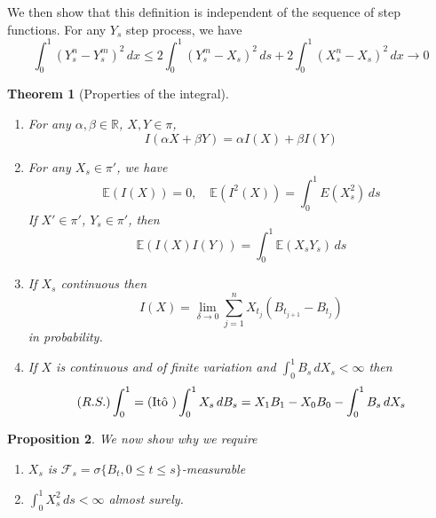 \documentclass[10pt, oneside, reqno]{amsart}
\theoremstyle{plain}%
\newtheorem{thm}{Theorem}[section]
\newtheorem{prop}[thm]{Proposition}
\theoremstyle{definition}
\theoremstyle{remark}
\newcommand{\R}{\mathbb{R}}
\newcommand{\E}{\mathbb{E}}
\newcommand{\sigf}{\mathcal{F}}
\begin{document}
We then show that this definition is independent of the sequence of step functions.  For any $Y_s$ step process, we have \[
	\int_0^1 (Y_s^n - Y_s^m)^2 \, dx \leq 2\int_0^1 (Y_s^m - X_s)^2 \, ds + 2 \int_0^1 (X_s^n - X_s)^2 \, dx \rightarrow 0
\] 

\begin{thm}[Properties of the \ito integral]{\ }
	\begin{enumerate}
		\item For any $\alpha, \beta \in \R$, $X, Y \in \pi$, \[
			I(\alpha X + \beta Y) = \alpha I(X) + \beta I(Y)
		\]
		\item For any $X_s \in \pi'$, we have \[
			\E(I(X)) = 0, \quad \E(I^2(X)) = \int_0^1 E(X_s^2) \, ds
		\]  If $X' \in \pi'$, $Y_s \in \pi'$, then \[
			\E(I(X) I(Y) ) = \int_0^1 \E(X_s Y_s) \, ds
		\]
		\item If $X_s$ continuous then \[
			I(X) = \lim_{\delta \rightarrow 0} \sum_{j=1}^n X_{t_j} (B_{t_{j+1}} - B_{t_j})
		\] in probability.
		\item If $X$ is continuous and of finite variation and $\int_0^1 B_s \, dX_s < \infty$ then \[
			(R.S.) \int_0^1 = (\text{It\^o\ }) \int_0^1 X_s \, dB_s = X_1 B_1 - X_0 B_0 - \int_0^1 B_s \, dX_s
		\]
	\end{enumerate}
\end{thm}
\begin{prop}
	We now show why we require
	\begin{enumerate}
		\item $X_s$ is $\sigf_s = \sigma \{ B_t, 0 \leq t \leq s \}$-measurable
		\item $\int_0^1 X_s^2 \, ds < \infty$ almost surely.  
	\end{enumerate}
\end{prop}
\end{document}
